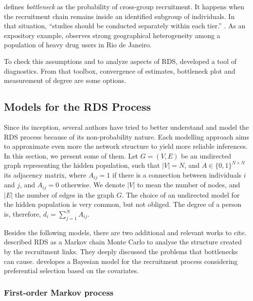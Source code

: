 \begin{alineas}
  \item \textcite[p. 2225]{goel2009respondent} defines {\em bottleneck}
  as the probability of cross-group recruitment. It happens when the
  recruitment chain remains inside an identified subgroup of individuals. In that
  situation, ``studies should be conducted separately within each tier.''
  \cite[p. 75]{gile2018methods}. As an expository example,
  \textcite[p. S139]{toledo2011putting} observes strong geographical
  heterogeneity among a population of heavy drug users in Rio de Janeiro. 
\end{alineas}

To check this assumptions and to analyze aspects of RDS,
\textcite{gile2015diagnostics} developed a tool of diagnostics. From
that toolbox, convergence of estimates, bottleneck plot and measurement of
degree are some options. 

\subsection{Models for the RDS Process}
\label{sec:models-rds-process}

Since its inception, several authors have tried to better understand and model
the RDS process because of its non-probability nature. Each modelling approach
aims to approximate even more the network structure to yield more reliable
inferences. In this section, we present some of them. Let $G = (V,E)$ be an
undirected graph representing the hidden population, such that $|V| = N$, and
$A \in \{0,1\}^{N \times N}$ its adjacency matrix, where $A_{ij} = 1$ if there
is a connection between individuals $i$ and $j$, and $A_{ij} = 0$ otherwise.
We denote $|V|$ to mean the number of nodes, and $|E|$ the number of edges in
the graph $G$. The choice of an undirected model for the hidden population is very common,
but not obliged. The degree of a person is, therefore, $d_i = \sum_{j=1}^N
A_{ij}$.

Besides the following models, there are two additional and relevant works  to
cite. \textcite{goel2009respondent} described RDS as a Markov chain Monte
Carlo to analyse the structure created by the recruitment links. They deeply
discussed the problems that bottlenecks can cause.
\textcite{mclaughlin2021bayesian} developes a Bayesian model for the
recruitment process considering preferential selection based on the covariates.


\subsubsection{First-order Markov process}
\label{sec:first-order-markov-process}

